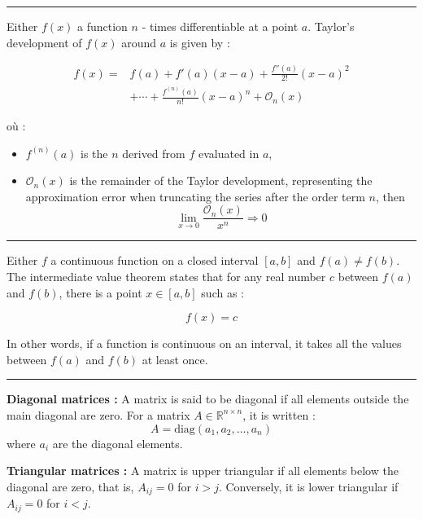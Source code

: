 \hrule
\begin{f}
 
Either \( f(x) \) a function \( n \) - times differentiable at a point \( a \). Taylor's development of \( f(x) \) around \( a \) is given by :

\begin{align*}
 f(x) =& f(a) + f'(a)(x - a) + \frac{f''(a)}{2!}(x - a)^2 \\
 &+ \cdots + \frac{f^{(n)}(a)}{n!}(x - a)^n + \mathcal{O}_n(x)
\end{align*}


où :
\begin{itemize}
    \item \( f^{(n)}(a) \) is the \( n \)\ieme{} derived from \( f \) evaluated in \( a \),
    \item \( \mathcal{O}_n(x) \) is the remainder of the Taylor development, representing the approximation error when truncating the series after the order term \( n \), then 
    \[
    \lim_{x\rightarrow 0}\frac{\mathcal{O}_n(x) }{x^n}\Rightarrow 0
    \]
\end{itemize}
\end{f}
\hrule
\begin{f} 

Either \( f \) a continuous function on a closed interval \([a, b]\) and \( f(a) \neq f(b) \). The intermediate value theorem states that for any real number \( c \) between \( f(a) \) and \( f(b) \), there is a point \( x \in [a, b] \) such as :

\[
f(x) = c
\]

In other words, if a function is continuous on an interval, it takes all the values between \( f(a) \) and \( f(b) \) at least once.
\end{f}
\hrule
\begin{f}
  
\textbf{Diagonal matrices :}
A matrix is said to be diagonal if all elements outside the main diagonal are zero. For a matrix \( A \in \mathbb{R}^{n \times n} \), it is written :
\[
A = \text{diag}(a_1, a_2, \dots, a_n)
\]
where \( a_i \) are the diagonal elements.

\textbf{Triangular matrices :}
A matrix is upper triangular if all elements below the diagonal are zero, that is, \( A_{ij} = 0 \) for \( i > j \). Conversely, it is lower triangular if \( A_{ij} = 0 \) for \( i < j \).
\end{f}
